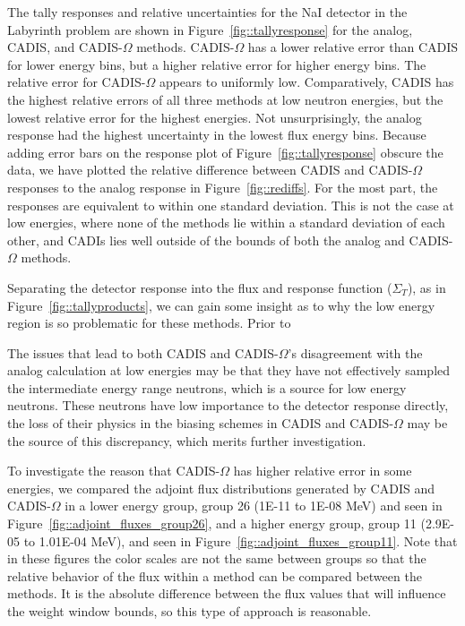 \documentclass[12pt]{article}
\begin{document}
The tally responses and relative uncertainties for the NaI detector in the Labyrinth problem are shown in Figure~\ref{fig::tallyresponse} for the analog, CADIS, and CADIS-$\Omega$ methods.  CADIS-$\Omega$ has a lower relative error than CADIS for lower energy bins, but a higher relative error for higher energy bins. The relative error for CADIS-$\Omega$ appears to uniformly low. Comparatively, CADIS has the highest relative errors of all three methods at low neutron energies, but the lowest relative error for the highest energies. Not unsurprisingly, the analog response had the highest uncertainty in the lowest flux energy bins. Because adding error bars on the response plot of Figure~\ref{fig::tallyresponse} obscure the data, we have plotted the relative difference between CADIS and CADIS-$\Omega$ responses to the analog response in Figure~\ref{fig::rediffs}. For the most part, the responses are equivalent to within one standard deviation. This is not the case at low energies, where none of the methods lie within a standard deviation of each other, and CADIs lies well outside of the bounds of both the analog and CADIS-$\Omega$ methods. 

Separating the detector response into the flux and response function ($\Sigma_{T}$), as in Figure~\ref{fig::tallyproducts}, we can gain some insight as to why the low energy region is so problematic for these methods. Prior to 

The issues that lead to both CADIS and CADIS-$\Omega$'s disagreement with the analog calculation at low energies may be that they have not effectively sampled the intermediate energy range neutrons, which is a source for low energy neutrons. These neutrons have low importance to the detector response directly, the loss of their physics in the biasing schemes in CADIS and CADIS-$\Omega$ may be the source of this discrepancy, which merits further investigation. 

To investigate the reason that CADIS-$\Omega$ has higher relative error in some energies, we compared the adjoint flux distributions generated by CADIS and CADIS-$\Omega$ in a lower energy group, group 26 (1E-11 to 1E-08 MeV) and seen in Figure~\ref{fig::adjoint_fluxes_group26}, and a higher energy group, group 11 (2.9E-05 to 1.01E-04 MeV), and seen in Figure~\ref{fig::adjoint_fluxes_group11}.
Note that in these figures the color scales are not the same between groups so that the relative behavior of the flux within a method can be compared between the methods. It is the absolute difference between the flux values that will influence the weight window bounds, so this type of approach is reasonable. 
\end{document}
